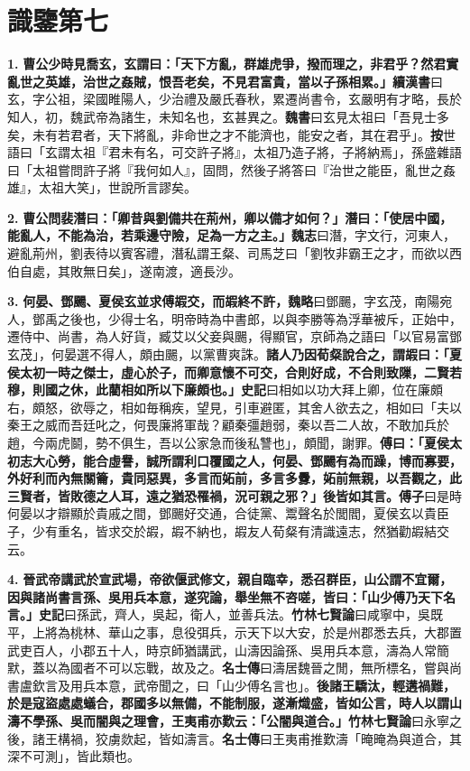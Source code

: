 \chapter{識鑒第七}

\textbf{1.} \textbf{曹公少時見喬玄，玄謂曰：「天下方亂，群雄虎爭，撥而理之，非君乎？然君實亂世之英雄，治世之姦賊，恨吾老矣，不見君富貴，當以子孫相累。」}{\footnotesize \textbf{續漢書}曰玄，字公祖，梁國睢陽人，少治禮及嚴氏春秋，累遷尚書令，玄嚴明有才略，長於知人，初，魏武帝為諸生，未知名也，玄甚異之。\textbf{魏書}曰玄見太祖曰「吾見士多矣，未有若君者，天下將亂，非命世之才不能濟也，能安之者，其在君乎」。\textbf{按}世語曰「玄謂太祖『君未有名，可交許子將』，太祖乃造子將，子將納焉」，孫盛雜語曰「太祖嘗問許子將『我何如人』，固問，然後子將答曰『治世之能臣，亂世之姦雄』，太祖大笑」，世說所言謬矣。}

\textbf{2.} \textbf{曹公問裴潛曰：「卿昔與劉備共在荊州，卿以備才如何？」潛曰：「使居中國，能亂人，不能為治，若乘邊守險，足為一方之主。」}{\footnotesize \textbf{魏志}曰潛，字文行，河東人，避亂荊州，劉表待以賓客禮，潛私謂王粲、司馬芝曰「劉牧非霸王之才，而欲以西伯自處，其敗無日矣」，遂南渡，適長沙。}

\textbf{3.} \textbf{何晏、鄧颺、夏侯玄並求傅嘏交，而嘏終不許，}{\footnotesize \textbf{魏略}曰鄧颺，字玄茂，南陽宛人，鄧禹之後也，少得士名，明帝時為中書郎，以與李勝等為浮華被斥，正始中，遷侍中、尚書，為人好貨，臧艾以父妾與颺，得顯官，京師為之語曰「以官易富鄧玄茂」，何晏選不得人，頗由颺，以黨曹爽誅。}\textbf{諸人乃因荀粲說合之，謂嘏曰：「夏侯太初一時之傑士，虛心於子，而卿意懷不可交，合則好成，不合則致隟，二賢若穆，則國之休，此藺相如所以下廉頗也。」}{\footnotesize \textbf{史記}曰相如以功大拜上卿，位在廉頗右，頗怒，欲辱之，相如毎稱疾，望見，引車避匿，其舍人欲去之，相如曰「夫以秦王之威而吾廷叱之，何畏廉將軍哉？顧秦彊趙弱，秦以吾二人故，不敢加兵於趙，今兩虎鬬，勢不俱生，吾以公家急而後私讐也」，頗聞，謝罪。}\textbf{傅曰：「夏侯太初志大心勞，能合虛譽，誠所謂利口覆國之人，何晏、鄧颺有為而躁，博而寡要，外好利而內無關籥，貴同惡異，多言而妬前，多言多釁，妬前無親，以吾觀之，此三賢者，皆敗德之人耳，遠之猶恐罹禍，況可親之邪？」後皆如其言。}{\footnotesize \textbf{傅子}曰是時何晏以才辯顯於貴戚之間，鄧颺好交通，合徒黨、鬻聲名於閭閻，夏侯玄以貴臣子，少有重名，皆求交於嘏，嘏不納也，嘏友人荀粲有清識遠志，然猶勸嘏結交云。}

\textbf{4.} \textbf{晉武帝講武於宣武場，帝欲偃武修文，親自臨幸，悉召群臣，山公謂不宜爾，因與諸尚書言孫、吳用兵本意，遂究論，舉坐無不咨嗟，皆曰：「山少傅乃天下名言。」}{\footnotesize \textbf{史記}曰孫武，齊人，吳起，衛人，並善兵法。\textbf{竹林七賢論}曰咸寧中，吳既平，上將為桃林、華山之事，息役弭兵，示天下以大安，於是州郡悉去兵，大郡置武吏百人，小郡五十人，時京師猶講武，山濤因論孫、吳用兵本意，濤為人常簡默，蓋以為國者不可以忘戰，故及之。\textbf{名士傳}曰濤居魏晉之閒，無所標名，嘗與尚書盧欽言及用兵本意，武帝聞之，曰「山少傅名言也」。}\textbf{後諸王驕汰，輕遘禍難，於是寇盜處處蟻合，郡國多以無備，不能制服，遂漸熾盛，皆如公言，時人以謂山濤不學孫、吳而闇與之理會，王夷甫亦歎云：「公闇與道合。」}{\footnotesize \textbf{竹林七賢論}曰永寧之後，諸王構禍，狡虜欻起，皆如濤言。\textbf{名士傳}曰王夷甫推歎濤「晻晻為與道合，其深不可測」，皆此類也。}

